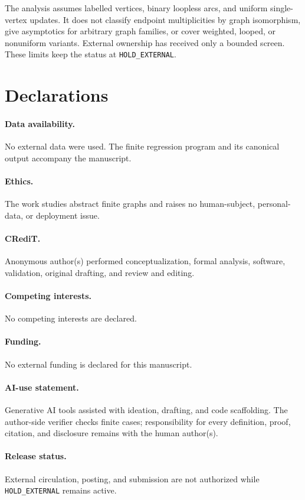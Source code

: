 \documentclass[a4paper,10pt]{amsart}
\theoremstyle{remark}
\begin{document}
The analysis assumes labelled vertices, binary loopless arcs, and uniform
single-vertex updates.  It does not classify endpoint multiplicities by graph
isomorphism, give asymptotics for arbitrary graph families, or cover weighted,
looped, or nonuniform variants.  External ownership has received only a
bounded screen.  These limits keep the status at \texttt{HOLD\_EXTERNAL}.

\section*{Declarations}

\paragraph{Data availability.} No external data were used.  The finite
regression program and its canonical output accompany the manuscript.
\paragraph{Ethics.} The work studies abstract finite graphs and raises no
human-subject, personal-data, or deployment issue.
\paragraph{CRediT.} Anonymous author(s) performed conceptualization, formal
analysis, software, validation, original drafting, and review and editing.
\paragraph{Competing interests.} No competing interests are declared.
\paragraph{Funding.} No external funding is declared for this manuscript.
\paragraph{AI-use statement.} Generative AI tools assisted with ideation,
drafting, and code scaffolding.  The author-side verifier checks finite cases;
responsibility for every definition, proof, citation, and disclosure remains
with the human author(s).
\paragraph{Release status.} External circulation, posting, and submission are
not authorized while \texttt{HOLD\_EXTERNAL} remains active.



\end{document}
